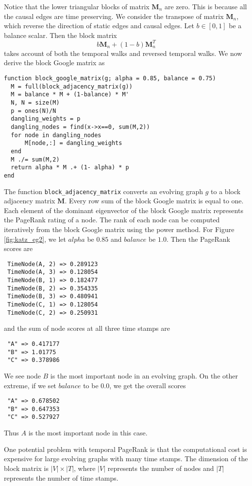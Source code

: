 \documentclass[12pt]{article}
\theoremstyle{definition}
\begin{document}
Notice that the lower triangular blocks of matrix $\bm M_n$ are zero.
This is because all the causal edges are time preserving. We consider the transpose of matrix $\bm M_n$, which reverse the direction of static edges and causal edges.
Let $b \in [0,1]$ be a balance scalar. Then the block matrix
$$
b \bm M_n + (1-b) \bm M_n^T
$$
takes account of both the temporal walks and reversed temporal walks.
We now derive the block Google matrix as

\begin{lstlisting}
function block_google_matrix(g; alpha = 0.85, balance = 0.75)
  M = full(block_adjacency_matrix(g))
  M = balance * M + (1-balance) * M'
  N, N = size(M)
  p = ones(N)/N
  dangling_weights = p
  dangling_nodes = find(x->x==0, sum(M,2))
  for node in dangling_nodes
      M[node,:] = dangling_weights
  end
  M ./= sum(M,2)
  return alpha * M .+ (1- alpha) * p
end
\end{lstlisting}

The function \texttt{block\_adjacency\_matrix} converts an evolving graph $g$ to a block adjacency matrix $\bm M$. Every row sum of the block Google matrix is equal to one. Each element of the dominant eigenvector of the block Google matrix
represents the PageRank rating of a node.
The rank of each node can be computed iteratively from the block Google matrix using the power method.
For Figure \ref{fig:katz_eg2}, we let $alpha$ be $0.85$ and $balance$ be $1.0$.
Then the PageRank scores are
\begin{lstlisting}
 TimeNode(A, 2) => 0.289123
 TimeNode(A, 3) => 0.128054
 TimeNode(B, 1) => 0.182477
 TimeNode(B, 2) => 0.354335
 TimeNode(B, 3) => 0.480941
 TimeNode(C, 1) => 0.128054
 TimeNode(C, 2) => 0.250931
\end{lstlisting}
and the sum of node scores at all three time stamps are
\begin{lstlisting}
 "A" => 0.417177
 "B" => 1.01775
 "C" => 0.378986
\end{lstlisting}
We see node $B$ is the most important node in an evolving graph.
On the other extreme, if we set $balance$ to be $0.0$, we get the overall scores
\begin{lstlisting}
 "A" => 0.678502
 "B" => 0.647353
 "C" => 0.527927
\end{lstlisting}
Thus $A$ is the most important node in this case.

One potential problem with temporal PageRank is that the computational cost is expensive for large evolving graphs with many time stamps. The dimension of the block matrix
is $|V| \times |T|$, where $|V|$ represents the number of nodes and $|T|$ represents the number of time stamps.
\end{document}
